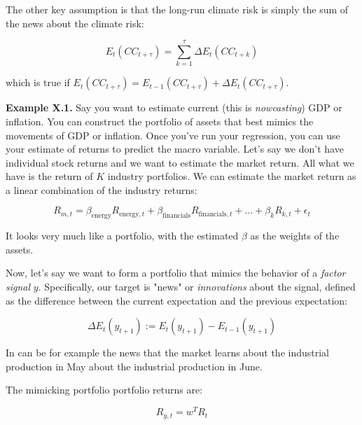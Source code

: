 The other key assumption is that 
the long-run climate risk is simply 
the sum of the news about the climate risk:

\begin{equation}
    E_t(CC_{t+\tau}) = \sum_{k=1}^{\tau} \Delta E_{t}(CC_{t+k})
\end{equation}

which is true if $E_t(CC_{t+\tau}) = E_{t-1}(CC_{t+\tau})
+ \Delta E_t(CC_{t+\tau})$.


\begin{examplebox}
    \textbf{Example X.1.}    
    Say you want to estimate current (this is \textit{nowcasting})
    GDP or inflation. You can construct the portfolio 
    of assets that best mimics the movements of GDP or inflation.
    Once you've run your regression, you can use your 
    estimate of returns to predict the macro variable.
    Let's say we don't have individual 
    stock returns and we want to estimate 
    the market return. All what we have is
    the return of $K$ industry portfolios. We 
    can estimate the market return as a 
    linear combination of the industry returns:
    
    \begin{equation}
    R_{m,t} = \beta_{\text{energy}} R_{\text{energy},t} + \beta_{\text{financials}} R_{\text{financials},t} + \ldots + \beta_{k} R_{k,t} + \epsilon_{t}
    \end{equation}
    
    It looks very much like a portfolio, with 
    the estimated $\beta$ as the weights of the assets.
\end{examplebox}

Now, let's say we want to form a portfolio that 
mimics the behavior of a \textit{factor signal} $y$.
Specifically, our target is "news" or \textit{innovations} about the signal,
defined as the difference between the current expectation 
and the previous expectation:

\begin{equation}
    \Delta E_t(y_{t+1}) := E_t(y_{t+1}) - E_{t-1}(y_{t+1})
\end{equation}

In can be for example the news that the market 
learns about the industrial production in May about 
the industrial production in June.

The mimicking portfolio portfolio returns are:

\begin{equation}
    R_{y, t} = w^T R_t
\end{equation}

